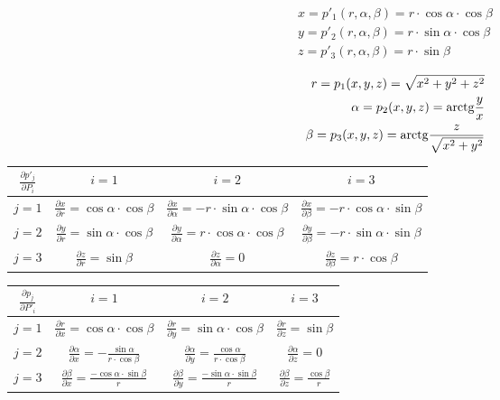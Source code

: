 \begin{equation}
\begin{split}
x = p'_1(r, \alpha, \beta) = r \cdot \cos \alpha \cdot \cos \beta \\
y = p'_2(r, \alpha, \beta) = r \cdot \sin \alpha \cdot \cos \beta \\
z = p'_3(r, \alpha, \beta) = r \cdot \sin \beta
\end{split}
\end{equation}

\begin{equation}
\begin{split}
r = p_1(x, y, z) = \sqrt{x^2 + y^2 + z^2} \\
\alpha = p_2(x, y, z) = \mathrm{arctg} \frac{y}{x} \\
\beta = p_3(x, y, z) = \mathrm{arctg} \frac{z}{\sqrt{x^2 + y^2}}
\end{split}
\end{equation}

\begin{tabular}{| c || c | c | c |}
\hline
\(\frac{\partial p'_j}{\partial P_i}\) & \(i=1\) & \(i=2\) & \(i=3\) \\
\hline
\hline
\(j=1\) & \(\frac{\partial x}{\partial r} = \cos \alpha \cdot \cos \beta\) & \(\frac{\partial x}{\partial \alpha} = -r \cdot \sin \alpha \cdot \cos \beta\) & \(\frac{\partial x}{\partial \beta} = -r \cdot \cos \alpha \cdot \sin \beta\) \\
\hline
\(j=2\) & \(\frac{\partial y}{\partial r} = \sin \alpha \cdot \cos \beta\) & \(\frac{\partial y}{\partial \alpha} = r \cdot \cos \alpha \cdot \cos \beta\) & \(\frac{\partial y}{\partial \beta} = -r \cdot \sin \alpha \cdot \sin \beta\) \\
\hline
\(j=3\) & \(\frac{\partial z}{\partial r} = \sin \beta\) & \(\frac{\partial z}{\partial \alpha} = 0\) & \(\frac{\partial z}{\partial \beta} = r \cdot \cos \beta\) \\
\hline
\end{tabular}

\begin{tabular}{| c || c | c | c |}
\hline
\(\frac{\partial p_j}{\partial P'_i}\) & \(i=1\) & \(i=2\) & \(i=3\)\\
\hline
\hline
\(j=1\) & \(\frac{\partial r}{\partial x} = \cos \alpha \cdot \cos \beta\) & \(\frac{\partial r}{\partial y} = \sin \alpha \cdot \cos \beta\) & \(\frac{\partial r}{\partial z} = \sin \beta\)\\
\hline
\(j=2\) & \(\frac{\partial \alpha}{\partial x} = -\frac{\sin \alpha}{r \cdot \cos \beta}\) & \(\frac{\partial \alpha}{\partial y} = \frac{\cos \alpha}{r \cdot \cos \beta}\) & \(\frac{\partial \alpha}{\partial z} = 0\)\\
\hline
\(j=3\) & \(\frac{\partial \beta}{\partial x} = \frac{-\cos \alpha \cdot \sin \beta}{r}\) & \(\frac{\partial \beta}{\partial y} = \frac{-\sin \alpha \cdot  \sin \beta}{r}\) & \(\frac{\partial \beta}{\partial z} = \frac{\cos \beta}{r}\)\\
\hline
\end{tabular}


